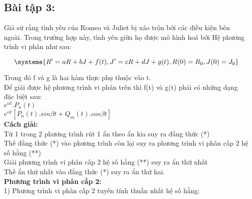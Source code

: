\newcommand{\hop}[1]{
    \begin{tcolorbox}
    [colback=cyan!15,colframe=orange!75!white]{#1}
    \end{tcolorbox}
}



    \subsection{Bài tập 3:} Giả sử rằng tình yêu của Romeo và Juliet bị xáo trộn bởi các điều kiện bên ngoài. Trong trường hợp này, tình yêu giữa họ được mô hình hoá bởi Hệ phương trình vi phân như sau:


    \begin{equation}
        \systeme{
            R' = aR + bJ + f(t),
            J' = cR + dJ + g(t),
            R(0) = R_0,
            J(0) = J_0
        }\label{eq:equation2}
    \end{equation}

    Trong đó f và g là hai hàm thực phụ thuộc vào t. \\

    Để giải được hệ phương trình vi phân trên thì f(t) và g(t) phải có những dạng đặc biệt sau: \\

    $e^{\alpha t}.P_n(t)$ \\

    $e^{\alpha t}[P_n(t).sin\beta t +Q_m(t).cos\beta t]$ \\

    \textbf{Cách giải:}\\

    Từ 1 trong 2 phương trình rút 1 ẩn theo ẩn kia suy ra đẳng thức (*) \\

    Thế đẳng thức (*) vào phương trình còn lại suy ra phương trình vi phân cấp 2 hệ số hằng (**) \\

    Giải phương trình vi phân cấp 2 hệ số hằng (**) suy ra ẩn thứ nhất \\

    Thế ẩn thứ nhất vào đẳng thức (*) suy ra ẩn thứ hai.\\

    \textbf{Phương trình vi phân cấp 2:}\\
    1) Phương trình vi phân cấp 2 tuyến tính thuần nhất hệ số hằng:\\


